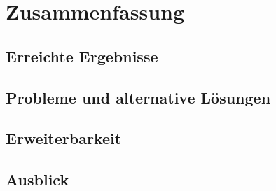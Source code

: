 \section{Zusammenfassung}

\subsection{Erreichte Ergebnisse}

\subsection{Probleme und alternative Lösungen}

\subsection{Erweiterbarkeit}

\subsection{Ausblick}